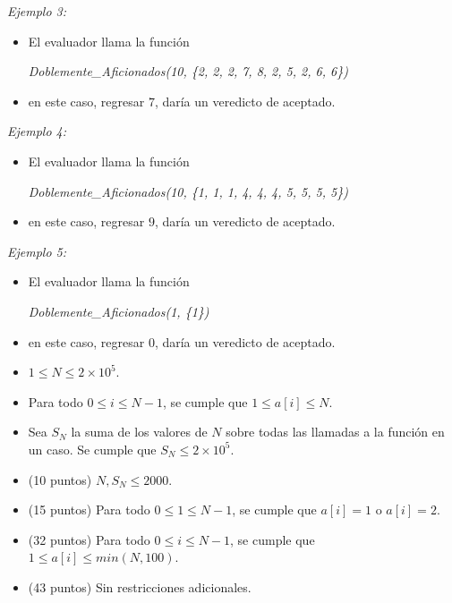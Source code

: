 \documentclass[12pt]{scrartcl}
\begin{document}
        {\itshape Ejemplo 3:}
        \begin{itemize}
            \item El evaluador llama la función 
            
            \begin{center}
                {\itshape Doblemente\_Aficionados(10, \{2, 2, 2, 7, 8, 2, 5, 2, 6, 6\})}
            \end{center}

            \item en este caso, regresar $7$, daría un veredicto de aceptado.
        \end{itemize}

        {\itshape Ejemplo 4:}
        \begin{itemize}
            \item El evaluador llama la función 

            \begin{center}
                {\itshape Doblemente\_Aficionados(10, \{1, 1, 1, 4, 4, 4, 5, 5, 5, 5\})}
            \end{center}

            \item en este caso, regresar $9$, daría un veredicto de aceptado.
        \end{itemize}
        
        {\itshape Ejemplo 5:}
        \begin{itemize}
            \item El evaluador llama la función 

            \begin{center}
                {\itshape Doblemente\_Aficionados(1, \{1\})}
            \end{center}

            \item en este caso, regresar $0$, daría un veredicto de aceptado.
        \end{itemize}
        
        \begin{itemize}
            \item $1 \le N \le 2 \times 10^5$.
            \item Para todo $0 \le i \le N - 1$, se cumple que $1 \le a[i] \le N$.
            \item Sea $S_N$ la suma de los valores de $N$ sobre todas las llamadas a la función en un caso. Se cumple que $S_N \le 2\times10^5$.
        \end{itemize}
    


    \begin{itemize}
        \item (10 puntos) $N, S_N \le 2000$.
        \item (15 puntos) Para todo $0 \le 1 \le N - 1$, se cumple que $a[i] = 1$ o $a[i] = 2$.
        \item (32 puntos) Para todo $0 \le i \le N - 1$, se cumple que $1 \le a[i] \le min(N, 100)$.
        \item (43 puntos) Sin restricciones adicionales.
    \end{itemize}
\end{document}
